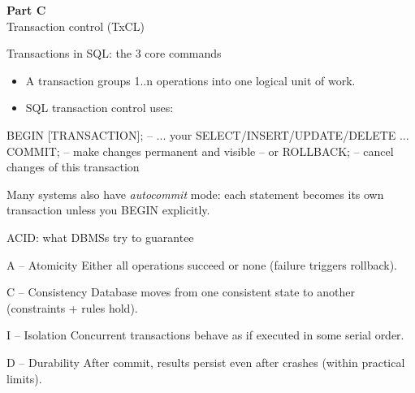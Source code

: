 \documentclass[10pt,aspectratio=169]{beamer}
\newcommand{\partslide}[2]{%
  \begin{frame}[plain]
    \vfill
    {\Huge\textbf{#1}}\\[0.6em]
    {\Large #2}
    \vfill
  \end{frame}
}
\begin{document}
\partslide{Part C}{Transaction control (TxCL)}

\begin{frame}[fragile]{Transactions in SQL: the 3 core commands}
\small
\begin{itemize}
  \item A transaction groups 1..n operations into one logical unit of work.
  \item SQL transaction control uses:
\end{itemize}
\vspace{1mm}
\begin{codesql}
BEGIN [TRANSACTION];
-- ... your SELECT/INSERT/UPDATE/DELETE ...
COMMIT;   -- make changes permanent and visible
-- or
ROLLBACK; -- cancel changes of this transaction
\end{codesql}

\vspace{1mm}
\footnotesize Many systems also have \emph{autocommit} mode: each statement becomes its own transaction unless you BEGIN explicitly.
\end{frame}

\begin{frame}{ACID: what DBMSs try to guarantee}
\small
\begin{block}{A -- Atomicity}
Either all operations succeed or none (failure triggers rollback).
\end{block}
\begin{block}{C -- Consistency}
Database moves from one consistent state to another (constraints + rules hold).
\end{block}
\begin{block}{I -- Isolation}
Concurrent transactions behave as if executed in some serial order.
\end{block}
\begin{block}{D -- Durability}
After commit, results persist even after crashes (within practical limits).
\end{block}
\end{frame}
\end{document}
